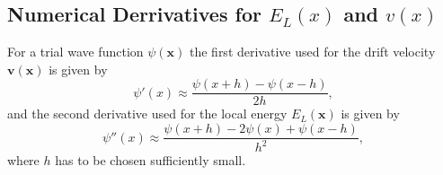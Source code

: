 \documentclass [12pt]{report}
\begin{document}
\begin{appendices}
\chapter{Numerical Derrivatives for $E_L(x)$ and $v(x)$} \label{appendixC}
For a trial wave function $\psi(\bm{x})$ the first derivative used for the drift velocity $\bm{v}(\bm{x})$ is given by
\begin{equation}
\psi'(x) \approx \frac{\psi(x + h) - \psi(x - h)}{2h},
\end{equation}
and the second derivative used for the local energy $E_L(\bm{x})$ is given by
\begin{equation}
\psi''(x) \approx \frac{\psi(x + h) - 2 \psi(x) + \psi(x - h)}{h^2},
\end{equation}
where $h$ has to be chosen sufficiently small.

\end{appendices}



\end{document}
